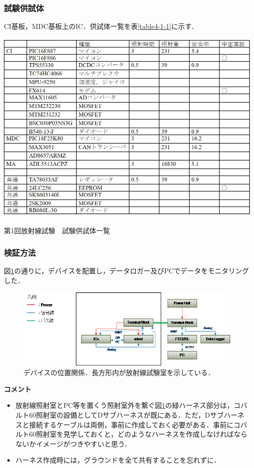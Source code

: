 \subsubsection{試験供試体}
CI基板，MDC基板上のIC．供試体一覧を表\ref{table4-1-1}に示す．

\begin{table}[H]
	\centering
	\includegraphics[scale=0.9]{04/fig/t4-1-1.jpg}
	\caption{第1回放射線試験　試験供試体一覧}
	\label{table4-1-1}
\end{table}

\subsubsection{検証方法}
図\ref{fig4-1-0}の通りに，デバイスを配置し，データロガー及びPCでデータをモニタリングした．
\begin{figure}[H]
	\centering
	\includegraphics[width=150mm]{04/fig/4-1-0.png}
	\caption{デバイスの位置関係．長方形内が放射線試験室を示している．}
	\label{fig4-1-0}
\end{figure}

\vspace{2ex} 
\textbf{コメント}
\begin{itemize}
	\item 放射線照射室とPC等を置くう照射室外を繋ぐ図\ref{fig4-1-0}の緑ハーネス部分は，コバルト60照射室の設備としてDサブハーネスが既にある．ただ，Dサブハーネスと接続するケーブルは両側，事前に作成しておく必要がある．事前にコバルト60照射室を見学しておくと，どのようなハーネスを作成しなければならないかイメージがつきやすいと思う．
	\item ハーネス作成時には，グラウンドを全て共有することを忘れずに．
\end{itemize}

